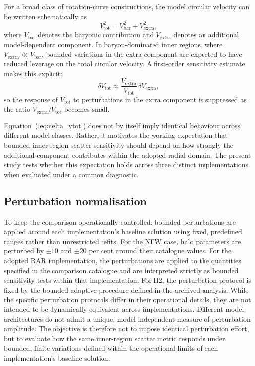 \documentclass[fleqn,usenatbib]{mnras}
\begin{document}
For a broad class of rotation-curve constructions, the model circular
velocity can be written schematically as
\begin{equation}
	V_{\mathrm{tot}}^2
	=
	V_{\mathrm{bar}}^2
	+
	V_{\mathrm{extra}}^2,
	\label{eq:quadrature_form}
\end{equation}
where $V_{\mathrm{bar}}$ denotes the baryonic contribution and
$V_{\mathrm{extra}}$ denotes an additional model-dependent component.
In baryon-dominated inner regions, where $V_{\mathrm{extra}} \ll
V_{\mathrm{bar}}$, bounded variations in the extra component are
expected to have reduced leverage on the total circular velocity. A
first-order sensitivity estimate makes this explicit:
\begin{equation}
	\delta V_{\mathrm{tot}}
	\approx
	\frac{V_{\mathrm{extra}}}{V_{\mathrm{tot}}}\,
	\delta V_{\mathrm{extra}},
	\label{eq:delta_vtot}
\end{equation}
so the response of $V_{\mathrm{tot}}$ to perturbations in the extra
component is suppressed as the ratio
$V_{\mathrm{extra}}/V_{\mathrm{tot}}$ becomes small.

Equation~(\ref{eq:delta_vtot}) does not by itself imply identical
behaviour across different model classes. Rather, it motivates the
working expectation that bounded inner-region scatter sensitivity should
depend on how strongly the additional component contributes within the
adopted radial domain. The present study tests whether this expectation 
holds across three distinct implementations when evaluated under a 
common diagnostic.

\subsection{Perturbation normalisation}
\label{subsec:perturbation_normalisation}

To keep the comparison operationally controlled, bounded perturbations
are applied around each implementation's baseline solution using fixed,
predefined ranges rather than unrestricted refits. For the NFW case,
halo parameters are perturbed by $\pm10$ and $\pm20$ per cent around
their catalogue values. For the adopted RAR implementation, the
perturbations are applied to the quantities specified in the comparison
catalogue and are interpreted strictly as bounded sensitivity tests
within that implementation. For H2, the perturbation protocol is fixed
by the bounded adaptive procedure defined in the archived analysis.
While the specific perturbation protocols differ in
their operational details, they are not intended to be dynamically
equivalent across implementations. Different model architectures do
not admit a unique, model-independent measure of perturbation
amplitude. The objective is therefore not to impose identical
perturbation effort, but to evaluate how the same inner-region scatter
metric responds under bounded, finite variations defined within the
operational limits of each implementation’s baseline solution.
\end{document}
